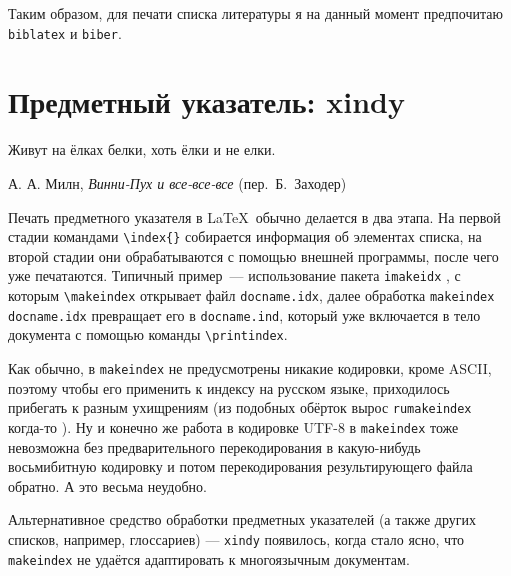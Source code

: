 \documentclass[a4paper,12pt,hyphens]{article}
\newcommand\package[1]{\texttt{#1}}
\newcommand\exe[1]{\texttt{#1}}
\newcommand\file[1]{\texttt{#1}}
\begin{document}
Таким образом, для печати списка литературы я на данный момент предпочитаю
\package{biblatex} и \exe{biber}.

\section{Предметный указатель: xindy}
\epigraph{Живут на ёлках белки, хоть ёлки и не елки.}{А. А. Милн, \emph{Винни-Пух и все-все-все} (пер.~Б.~Заходер)}
Печать предметного указателя в \LaTeX\ обычно делается в два этапа. На первой стадии
командами \verb|\index{}| собирается информация об элементах списка,
на второй стадии они обрабатываются с помощью внешней программы, после
чего уже печатаются. Типичный пример~--- использование пакета \package{imakeidx} \parencite{ctan-imakeidx},
с которым \verb|\makeindex| открывает файл \file{docname.idx}, далее
обработка \package{makeindex} \parencite{ctan-makeindex}
\file{docname.idx} превращает его в \file{docname.ind},
который уже включается в тело документа с помощью команды \verb|\printindex|.

Как обычно, в \exe{makeindex} не предусмотрены никакие кодировки, кроме ASCII,
поэтому чтобы его применить к индексу на русском языке, приходилось прибегать
к разным ухищрениям (из подобных обёрток вырос
\exe{rumakeindex} когда-то \parencite{site-rumakeindex}). Ну и конечно
же работа в кодировке UTF-8 в \exe{makeindex} тоже невозможна без предварительного
перекодирования в какую-нибудь восьмибитную кодировку и потом перекодирования
результирующего файла обратно. А это весьма неудобно.

Альтернативное средство обработки предметных указателей (а также других списков,
например, глоссариев) --- \exe{xindy} \parencite{ctan-xindy}
появилось, когда стало ясно, что
\exe{makeindex} не удаётся адаптировать к многоязычным документам.
\end{document}
